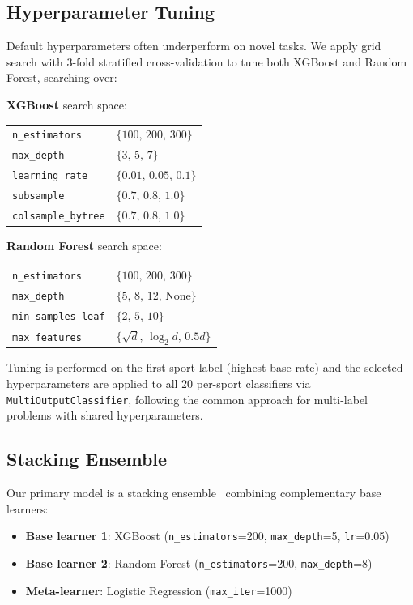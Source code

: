 \documentclass[conference]{IEEEtran}
\begin{document}
\subsection{Hyperparameter Tuning}

Default hyperparameters often underperform on novel tasks.
We apply grid search with 3-fold stratified cross-validation
to tune both XGBoost and Random Forest, searching over:

\smallskip
\noindent\textbf{XGBoost} search space:
\smallskip

\noindent
\begin{tabular}{@{}ll@{}}
\texttt{n\_estimators}       & $\{100,\, 200,\, 300\}$ \\
\texttt{max\_depth}          & $\{3,\, 5,\, 7\}$ \\
\texttt{learning\_rate}      & $\{0.01,\, 0.05,\, 0.1\}$ \\
\texttt{subsample}           & $\{0.7,\, 0.8,\, 1.0\}$ \\
\texttt{colsample\_bytree}   & $\{0.7,\, 0.8,\, 1.0\}$ \\
\end{tabular}

\smallskip
\noindent\textbf{Random Forest} search space:
\smallskip

\noindent
\begin{tabular}{@{}ll@{}}
\texttt{n\_estimators}       & $\{100,\, 200,\, 300\}$ \\
\texttt{max\_depth}          & $\{5,\, 8,\, 12,\, \text{None}\}$ \\
\texttt{min\_samples\_leaf}  & $\{2,\, 5,\, 10\}$ \\
\texttt{max\_features}       & $\{\sqrt{d},\, \log_2 d,\, 0.5d\}$ \\
\end{tabular}
\smallskip

Tuning is performed on the first sport label (highest base rate) and the
selected hyperparameters are applied to all 20 per-sport classifiers via
\texttt{MultiOutputClassifier}, following the common approach for
multi-label problems with shared hyperparameters.

\subsection{Stacking Ensemble}

Our primary model is a stacking ensemble~\cite{wolpert1992stacked}
combining complementary base learners:

\begin{itemize}
  \item \textbf{Base learner 1}: XGBoost (\texttt{n\_estimators}=200,
        \texttt{max\_depth}=5, \texttt{lr}=0.05)
  \item \textbf{Base learner 2}: Random Forest (\texttt{n\_estimators}=200,
        \texttt{max\_depth}=8)
  \item \textbf{Meta-learner}: Logistic Regression (\texttt{max\_iter}=1000)
\end{itemize}
\end{document}
